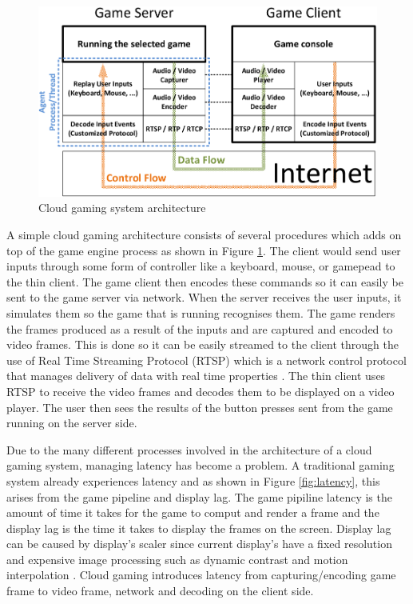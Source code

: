 \begin{figure}[h]
 \includegraphics[width=\linewidth]{images/arch.png}
 \caption{Cloud gaming system architecture}
 \label{fig:arch}
\end{figure}

A simple cloud gaming architecture consists of several procedures which adds on top of the game engine process as shown in Figure \ref{fig:arch}. The client would send user inputs through some form of controller like a keyboard, mouse, or gamepead to the thin client. The game client then encodes these commands so it can easily be sent to the game server via network. When the server receives the user inputs, it simulates them so the game that is running recognises them. The game renders the frames produced as a result of the inputs and are captured and encoded to video frames. This is done so it can be easily streamed to the client through the use of Real Time Streaming Protocol (RTSP) which is a network control protocol that manages delivery of data with real time properties \cite{rtsp}. The thin client uses RTSP to receive the video frames and decodes them to be displayed on a video player. The user then sees the results of the button presses sent from the game running on the server side.
\newline 
\par
Due to the many different processes involved in the architecture of a cloud gaming system, managing latency has become a problem. A traditional gaming system already experiences latency and as shown in Figure \ref{fig:latency}, this arises from the game pipeline and display lag. The game pipiline latency is the amount of time it takes for the game to comput and render a frame and the display lag is the time it takes to display the frames on the screen. Display lag can be caused by display's scaler since current display's have a fixed resolution and expensive image processing such as dynamic contrast and motion interpolation \cite{displaylag}. Cloud gaming introduces latency from capturing/encoding game frame to video frame, network and decoding on the client side.

